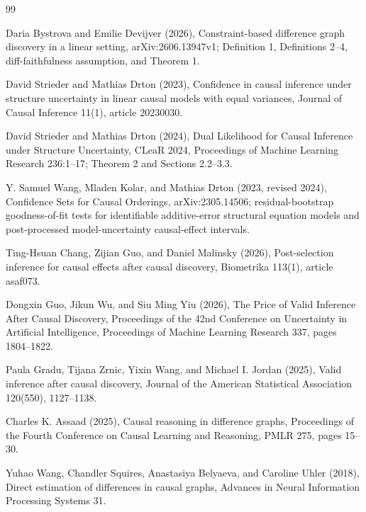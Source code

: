 \documentclass{article}
\begin{document}
\begin{thebibliography}{99}

   Daria Bystrova and Emilie Devijver (2026), Constraint-based difference graph discovery in a linear setting, arXiv:2606.13947v1; Definition 1, Definitions 2--4, diff-faithfulness assumption, and Theorem 1.

   David Strieder and Mathias Drton (2023), Confidence in causal inference under structure uncertainty in linear causal models with equal variances, Journal of Causal Inference 11(1), article 20230030.

   David Strieder and Mathias Drton (2024), Dual Likelihood for Causal Inference under Structure Uncertainty, CLeaR 2024, Proceedings of Machine Learning Research 236:1--17; Theorem 2 and Sections 2.2--3.3.

   Y. Samuel Wang, Mladen Kolar, and Mathias Drton (2023, revised 2024), Confidence Sets for Causal Orderings, arXiv:2305.14506; residual-bootstrap goodness-of-fit tests for identifiable additive-error structural equation models and post-processed model-uncertainty causal-effect intervals.

   Ting-Hsuan Chang, Zijian Guo, and Daniel Malinsky (2026), Post-selection inference for causal effects after causal discovery, Biometrika 113(1), article asaf073.

   Dongxin Guo, Jikun Wu, and Siu Ming Yiu (2026), The Price of Valid Inference After Causal Discovery, Proceedings of the 42nd Conference on Uncertainty in Artificial Intelligence, Proceedings of Machine Learning Research 337, pages 1804--1822.

   Paula Gradu, Tijana Zrnic, Yixin Wang, and Michael I. Jordan (2025), Valid inference after causal discovery, Journal of the American Statistical Association 120(550), 1127--1138.

   Charles K. Assaad (2025), Causal reasoning in difference graphs, Proceedings of the Fourth Conference on Causal Learning and Reasoning, PMLR 275, pages 15--30.

   Yuhao Wang, Chandler Squires, Anastasiya Belyaeva, and Caroline Uhler (2018), Direct estimation of differences in causal graphs, Advances in Neural Information Processing Systems 31.


\end{thebibliography}
\end{document}
